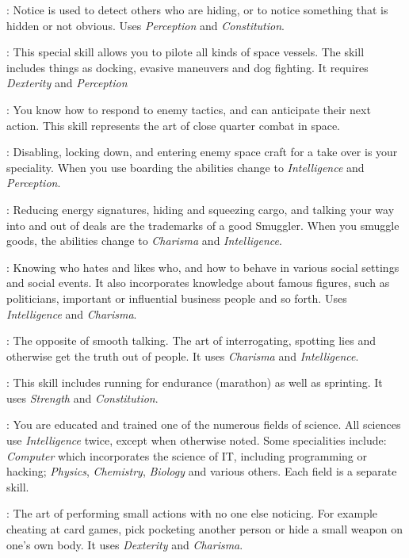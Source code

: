: Notice is used to detect others who are hiding, or to notice
something that is hidden or not obvious. Uses \emph{Perception} and
\emph{Constitution}.

: This special skill allows you to pilote all
kinds of space vessels. The skill includes things as docking, evasive maneuvers
and dog fighting. It requires \emph{Dexterity} and \emph{Perception}

: You know how to respond to
enemy tactics, and can anticipate their next action. This skill represents the
art of close quarter combat in space.

: Disabling, locking down, and
entering enemy space craft for a take over is your speciality. When you use
boarding the abilities change to \emph{Intelligence} and \emph{Perception}.

: Reducing energy signatures,
hiding and squeezing cargo, and talking your way into and out of deals are the
trademarks of a good Smuggler. When you smuggle goods, the abilities change to
\emph{Charisma} and \emph{Intelligence}.

: Knowing who hates and likes who, and how to behave in
various social settings and social events. It also incorporates knowledge about
famous figures, such as politicians, important or influential business people
and so forth. Uses \emph{Intelligence} and \emph{Charisma}.

: The opposite of smooth talking. The art of interrogating,
spotting lies and otherwise get the truth out of people. It uses \emph{Charisma}
and \emph{Intelligence}.

: This skill includes running for endurance (marathon) as well as
sprinting. It uses \emph{Strength} and \emph{Constitution}.

: You are educated and trained one of the numerous
fields of science. All sciences use \emph{Intelligence} twice, except when
otherwise noted. Some specialities include: \emph{Computer} which incorporates
the science of IT, including programming or hacking; \emph{Physics},
\emph{Chemistry}, \emph{Biology} and various others. Each field is a separate
skill.

: The art of performing small actions with no one else
noticing. For example cheating at card games, pick pocketing another person
or hide a small weapon on one's own body. It uses \emph{Dexterity} and
\emph{Charisma}.

